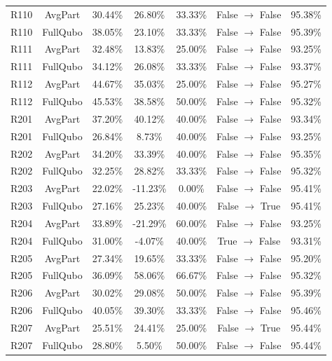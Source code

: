 \documentclass[conference]{IEEEtran}
\begin{document}
\begin{table}[htbp]
{\begin{tabular}{lcccccc}
R110 & AvgPart & 30.44\% & 26.80\% & 33.33\% & False $\to$ False & 95.38\% \\
R110 & FullQubo & 38.05\% & 23.10\% & 33.33\% & False $\to$ False & 95.39\% \\

R111 & AvgPart & 32.48\% & 13.83\% & 25.00\% & False $\to$ False & 93.25\% \\
R111 & FullQubo & 34.12\% & 26.08\% & 33.33\% & False $\to$ False & 93.37\% \\

R112 & AvgPart & 44.67\% & 35.03\% & 25.00\% & False $\to$ False & 95.27\% \\
R112 & FullQubo & 45.53\% & 38.58\% & 50.00\% & False $\to$ False & 95.32\% \\

R201 & AvgPart & 37.20\% & 40.12\% & 40.00\% & False $\to$ False & 93.34\% \\
R201 & FullQubo & 26.84\% & 8.73\% & 40.00\% & False $\to$ False & 93.25\% \\

R202 & AvgPart & 34.20\% & 33.39\% & 40.00\% & False $\to$ False & 95.35\% \\
R202 & FullQubo & 32.25\% & 28.82\% & 33.33\% & False $\to$ False & 95.32\% \\

R203 & AvgPart & 22.02\% & -11.23\% & 0.00\% & False $\to$ False & 95.41\% \\
R203 & FullQubo & 27.16\% & 25.23\% & 40.00\% & False $\to$ True & 95.41\% \\

R204 & AvgPart & 33.89\% & -21.29\% & 60.00\% & False $\to$ False & 93.25\% \\
R204 & FullQubo & 31.00\% & -4.07\% & 40.00\% & True $\to$ False & 93.31\% \\

R205 & AvgPart & 27.34\% & 19.65\% & 33.33\% & False $\to$ False & 95.20\% \\
R205 & FullQubo & 36.09\% & 58.06\% & 66.67\% & False $\to$ False & 95.32\% \\

R206 & AvgPart & 30.02\% & 29.08\% & 50.00\% & False $\to$ False & 95.39\% \\
R206 & FullQubo & 40.05\% & 39.30\% & 33.33\% & False $\to$ False & 95.46\% \\

R207 & AvgPart & 25.51\% & 24.41\% & 25.00\% & False $\to$ True & 95.44\% \\
R207 & FullQubo & 28.80\% & 5.50\% & 50.00\% & False $\to$ False & 95.44\% \\


\end{tabular}}
\end{table}
\end{document}
